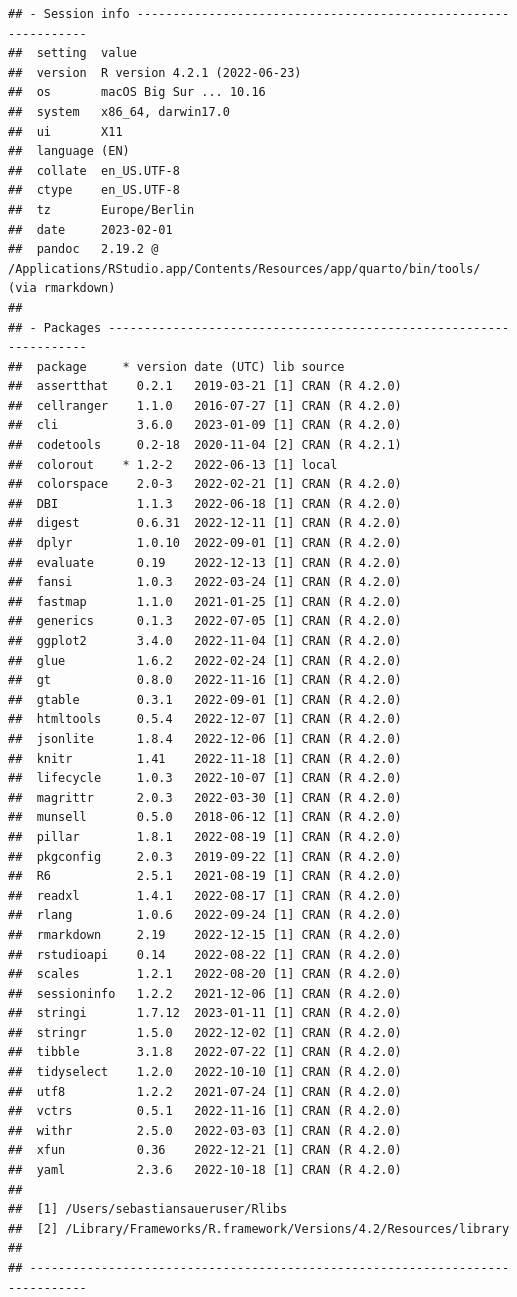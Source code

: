 \documentclass[
  a4paper,
  DIV=11]{scrreprt}
\theoremstyle{definition}
\theoremstyle{definition}
\theoremstyle{remark}
\begin{document}
\begin{verbatim}
## - Session info ---------------------------------------------------------------
##  setting  value
##  version  R version 4.2.1 (2022-06-23)
##  os       macOS Big Sur ... 10.16
##  system   x86_64, darwin17.0
##  ui       X11
##  language (EN)
##  collate  en_US.UTF-8
##  ctype    en_US.UTF-8
##  tz       Europe/Berlin
##  date     2023-02-01
##  pandoc   2.19.2 @ /Applications/RStudio.app/Contents/Resources/app/quarto/bin/tools/ (via rmarkdown)
## 
## - Packages -------------------------------------------------------------------
##  package     * version date (UTC) lib source
##  assertthat    0.2.1   2019-03-21 [1] CRAN (R 4.2.0)
##  cellranger    1.1.0   2016-07-27 [1] CRAN (R 4.2.0)
##  cli           3.6.0   2023-01-09 [1] CRAN (R 4.2.0)
##  codetools     0.2-18  2020-11-04 [2] CRAN (R 4.2.1)
##  colorout    * 1.2-2   2022-06-13 [1] local
##  colorspace    2.0-3   2022-02-21 [1] CRAN (R 4.2.0)
##  DBI           1.1.3   2022-06-18 [1] CRAN (R 4.2.0)
##  digest        0.6.31  2022-12-11 [1] CRAN (R 4.2.0)
##  dplyr         1.0.10  2022-09-01 [1] CRAN (R 4.2.0)
##  evaluate      0.19    2022-12-13 [1] CRAN (R 4.2.0)
##  fansi         1.0.3   2022-03-24 [1] CRAN (R 4.2.0)
##  fastmap       1.1.0   2021-01-25 [1] CRAN (R 4.2.0)
##  generics      0.1.3   2022-07-05 [1] CRAN (R 4.2.0)
##  ggplot2       3.4.0   2022-11-04 [1] CRAN (R 4.2.0)
##  glue          1.6.2   2022-02-24 [1] CRAN (R 4.2.0)
##  gt            0.8.0   2022-11-16 [1] CRAN (R 4.2.0)
##  gtable        0.3.1   2022-09-01 [1] CRAN (R 4.2.0)
##  htmltools     0.5.4   2022-12-07 [1] CRAN (R 4.2.0)
##  jsonlite      1.8.4   2022-12-06 [1] CRAN (R 4.2.0)
##  knitr         1.41    2022-11-18 [1] CRAN (R 4.2.0)
##  lifecycle     1.0.3   2022-10-07 [1] CRAN (R 4.2.0)
##  magrittr      2.0.3   2022-03-30 [1] CRAN (R 4.2.0)
##  munsell       0.5.0   2018-06-12 [1] CRAN (R 4.2.0)
##  pillar        1.8.1   2022-08-19 [1] CRAN (R 4.2.0)
##  pkgconfig     2.0.3   2019-09-22 [1] CRAN (R 4.2.0)
##  R6            2.5.1   2021-08-19 [1] CRAN (R 4.2.0)
##  readxl        1.4.1   2022-08-17 [1] CRAN (R 4.2.0)
##  rlang         1.0.6   2022-09-24 [1] CRAN (R 4.2.0)
##  rmarkdown     2.19    2022-12-15 [1] CRAN (R 4.2.0)
##  rstudioapi    0.14    2022-08-22 [1] CRAN (R 4.2.0)
##  scales        1.2.1   2022-08-20 [1] CRAN (R 4.2.0)
##  sessioninfo   1.2.2   2021-12-06 [1] CRAN (R 4.2.0)
##  stringi       1.7.12  2023-01-11 [1] CRAN (R 4.2.0)
##  stringr       1.5.0   2022-12-02 [1] CRAN (R 4.2.0)
##  tibble        3.1.8   2022-07-22 [1] CRAN (R 4.2.0)
##  tidyselect    1.2.0   2022-10-10 [1] CRAN (R 4.2.0)
##  utf8          1.2.2   2021-07-24 [1] CRAN (R 4.2.0)
##  vctrs         0.5.1   2022-11-16 [1] CRAN (R 4.2.0)
##  withr         2.5.0   2022-03-03 [1] CRAN (R 4.2.0)
##  xfun          0.36    2022-12-21 [1] CRAN (R 4.2.0)
##  yaml          2.3.6   2022-10-18 [1] CRAN (R 4.2.0)
## 
##  [1] /Users/sebastiansaueruser/Rlibs
##  [2] /Library/Frameworks/R.framework/Versions/4.2/Resources/library
## 
## ------------------------------------------------------------------------------
\end{verbatim}
\end{document}
